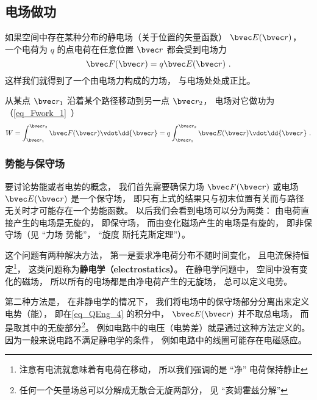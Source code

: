 

\subsection{电场做功}
如果空间中存在某种分布的静电场（关于位置的矢量函数） $\bvec E(\bvec r)$， 一个电荷为 $q$ 的点电荷在任意位置 $\bvec r$ 都会受到电场力
\begin{equation}
\bvec F(\bvec r) = q \bvec E(\bvec r)~.
\end{equation}
这样我们就得到了一个由电场力构成的力场， 与电场处处成正比。 

从某点 $\bvec r_1$ 沿着某个路径移动到另一点 $\bvec r_2$， 电场对它做功为（\autoref{eq_Fwork_1}~）
\begin{equation}\label{eq_QEng_4}
W = \int_{\bvec r_1}^{\bvec r_2} \bvec F(\bvec r) \vdot \dd{\bvec r} = q \int_{\bvec r_1}^{\bvec r_2} \bvec E(\bvec r) \vdot \dd{\bvec r}~.
\end{equation}

\subsubsection{势能与保守场}
要讨论势能或者电势的概念， 我们首先需要确保力场 $\bvec F(\bvec r)$ 或电场 $\bvec E(\bvec r)$ 是一个保守场， 即只有上式的结果只与初末位置有关而与路径无关时才可能存在一个势能函数。 以后我们会看到电场可以分为两类： 由电荷直接产生的电场是无旋的， 即保守场， 而由变化磁场产生的电场是有旋的， 即非保守场（见 “力场 势能”， “旋度 斯托克斯定理”）。

这个问题有两种解决方法， 第一是要求净电荷分布不随时间变化， 且电流保持恒定\footnote{注意有电流就意味着有电荷在移动， 所以我们强调的是 “净” 电荷保持静止}， 这类问题称为\textbf{静电学（electrostatics）}。 在静电学问题中， 空间中没有变化的磁场， 所以所有的电场都是由净电荷产生的无旋场， 总可以定义电势。

第二种方法是， 在非静电学的情况下， 我们将电场中的保守场部分分离出来定义电势（能）， 即在\autoref{eq_QEng_4} 的积分中， $\bvec E(\bvec r)$ 并不取总电场， 而是取其中的无旋部分\footnote{任何一个矢量场总可以分解成无散合无旋两部分， 见 “亥姆霍兹分解”}。 例如电路中的电压（电势差）就是通过这种方法定义的。 因为一般来说电路不满足静电学的条件， 例如电路中的线圈可能存在电磁感应。

